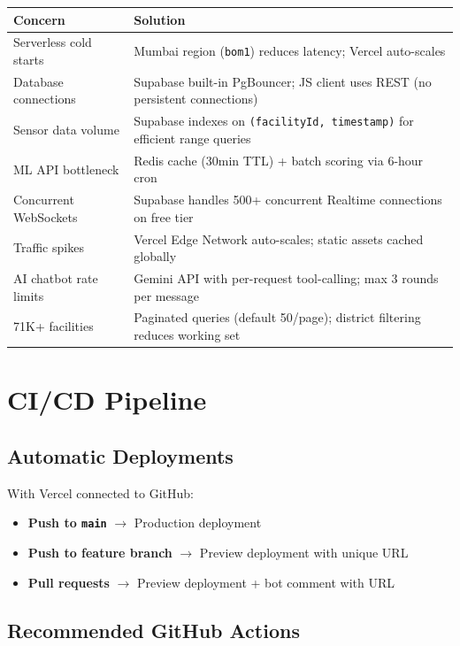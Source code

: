 \documentclass[12pt,a4paper]{report}
\begin{document}
\begin{tabularx}{\textwidth}{lX}
\toprule
\textbf{Concern} & \textbf{Solution} \\
\midrule
Serverless cold starts   & Mumbai region (\texttt{bom1}) reduces latency; Vercel auto-scales \\
Database connections      & Supabase built-in PgBouncer; JS client uses REST (no persistent connections) \\
Sensor data volume        & Supabase indexes on \texttt{(facilityId, timestamp)} for efficient range queries \\
ML API bottleneck         & Redis cache (30min TTL) + batch scoring via 6-hour cron \\
Concurrent WebSockets     & Supabase handles 500+ concurrent Realtime connections on free tier \\
Traffic spikes            & Vercel Edge Network auto-scales; static assets cached globally \\
AI chatbot rate limits    & Gemini API with per-request tool-calling; max 3 rounds per message \\
71K+ facilities           & Paginated queries (default 50/page); district filtering reduces working set \\
\bottomrule
\end{tabularx}

\chapter{CI/CD Pipeline}

\section{Automatic Deployments}

With Vercel connected to GitHub:

\begin{itemize}
  \item \textbf{Push to \texttt{main}} $\rightarrow$ Production deployment
  \item \textbf{Push to feature branch} $\rightarrow$ Preview deployment with unique URL
  \item \textbf{Pull requests} $\rightarrow$ Preview deployment + bot comment with URL
\end{itemize}

\section{Recommended GitHub Actions}
\end{document}
